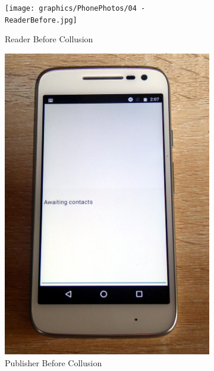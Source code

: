 \begin{figure}
	\centering
	
	\begin{subfigure}{0.49\textwidth}
		\centering
		\texttt{[image: graphics/PhonePhotos/04 - ReaderBefore.jpg]}
		\caption{Reader Before Collusion}
		\label{fig:ReaderBefore}
	\end{subfigure}
\hfill	
	\begin{subfigure}{0.49\textwidth}
		\centering
		\includegraphics[height=0.45\textheight]{graphics/PhonePhotos/05 - PublisherBefore.jpg}
		\caption{Publisher Before Collusion}
		\label{fig:PublisherBefore}
	\end{subfigure}
\\
	\begin{subfigure}{0.49\textwidth}
		\centering

\end{subfigure}
\end{figure}
